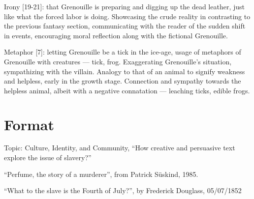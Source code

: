 \documentclass[a4paper,12pt]{article}
\begin{document}
Irony [19-21]: that Grenouille is preparing and digging up the dead leather, just like what the forced labor is doing. Showcasing the crude reality in contrasting to the previous fantasy section, communicating with the reader of the sudden shift in events, encouraging moral reflection along with the fictional Grenouille.

Metaphor [7]: letting Grenouille be a tick in the ice-age, usage of metaphors of Grenouille with creatures --- tick, frog. Exaggerating Grenouille's situation, sympathizing with the villain. Analogy to that of an animal to signify weakness and helpless, early in the growth stage. Connection and sympathy towards the helpless animal, albeit with a negative connatation --- leaching ticks, edible frogs.

\section{Format}

Topic: Culture, Identity, and Community, ``How creative and persuasive text explore the issue of slavery?''

``Perfume, the story of a murderer'', from Patrick S\"uskind, 1985.

``What to the slave is the Fourth of July?'', by Frederick Douglass, 05/07/1852
\end{document}
